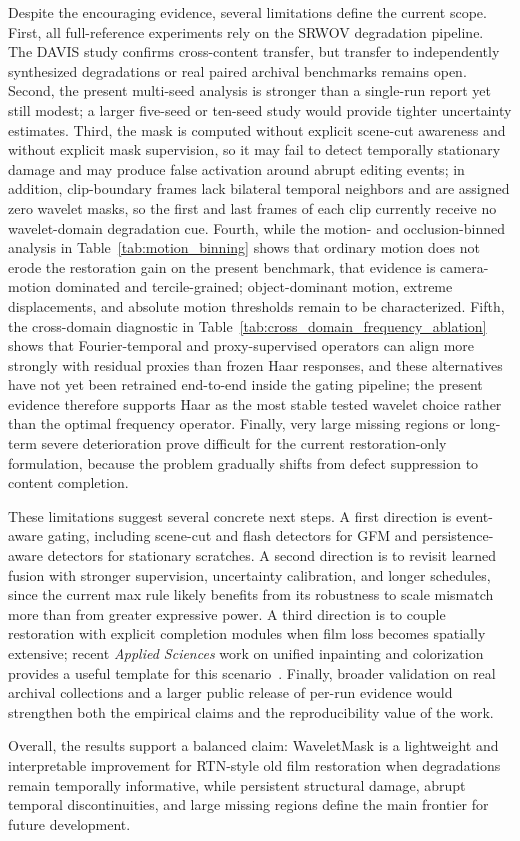 Despite the encouraging evidence, several limitations define the current scope. First, all full-reference experiments rely on the SRWOV degradation pipeline. The DAVIS study confirms cross-content transfer, but transfer to independently synthesized degradations or real paired archival benchmarks remains open. Second, the present multi-seed analysis is stronger than a single-run report yet still modest; a larger five-seed or ten-seed study would provide tighter uncertainty estimates. Third, the mask is computed without explicit scene-cut awareness and without explicit mask supervision, so it may fail to detect temporally stationary damage and may produce false activation around abrupt editing events; in addition, clip-boundary frames lack bilateral temporal neighbors and are assigned zero wavelet masks, so the first and last frames of each clip currently receive no wavelet-domain degradation cue. Fourth, while the motion- and occlusion-binned analysis in Table~\ref{tab:motion_binning} shows that ordinary motion does not erode the restoration gain on the present benchmark, that evidence is camera-motion dominated and tercile-grained; object-dominant motion, extreme displacements, and absolute motion thresholds remain to be characterized. Fifth, the cross-domain diagnostic in Table~\ref{tab:cross_domain_frequency_ablation} shows that Fourier-temporal and proxy-supervised operators can align more strongly with residual proxies than frozen Haar responses, and these alternatives have not yet been retrained end-to-end inside the gating pipeline; the present evidence therefore supports Haar as the most stable tested wavelet choice rather than the optimal frequency operator. Finally, very large missing regions or long-term severe deterioration prove difficult for the current restoration-only formulation, because the problem gradually shifts from defect suppression to content completion.

These limitations suggest several concrete next steps. A first direction is event-aware gating, including scene-cut and flash detectors for GFM and persistence-aware detectors for stationary scratches. A second direction is to revisit learned fusion with stronger supervision, uncertainty calibration, and longer schedules, since the current max rule likely benefits from its robustness to scale mismatch more than from greater expressive power. A third direction is to couple restoration with explicit completion modules when film loss becomes spatially extensive; recent \textit{Applied Sciences} work on unified inpainting and colorization provides a useful template for this scenario~\cite{yeo2025integration}. Finally, broader validation on real archival collections and a larger public release of per-run evidence would strengthen both the empirical claims and the reproducibility value of the work.

Overall, the results support a balanced claim: WaveletMask is a lightweight and interpretable improvement for RTN-style old film restoration when degradations remain temporally informative, while persistent structural damage, abrupt temporal discontinuities, and large missing regions define the main frontier for future development.
